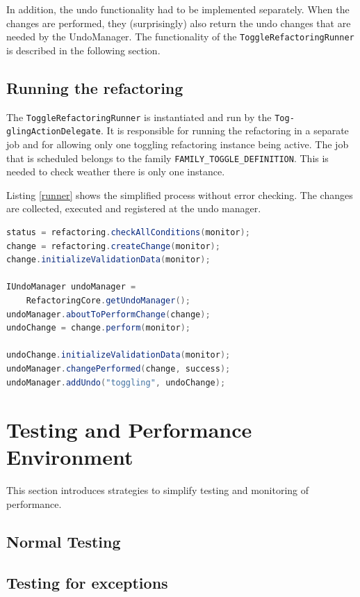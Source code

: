 In addition, the undo functionality had to be implemented separately. When the 
changes are performed, they (surprisingly) also return the undo changes that are 
needed by the UndoManager. The functionality of the 
\texttt{ToggleRefactoringRunner} is described in the following section.

\subsection{Running the refactoring}\label{runnersec}
The \texttt{ToggleRefactoringRunner} is instantiated and run by the 
\texttt{Tog- glingActionDelegate}. It is responsible for running the refactoring 
in a separate job and for allowing only one toggling refactoring instance being
active. The job that is scheduled belongs to the family
\texttt{FAMILY\_TOGGLE\_DEFINITION}. This is needed to check weather there is
only one instance.

Listing \ref{runner} shows the simplified process without error checking. The 
changes are collected, executed and registered at the undo manager.

\begin{lstlisting}[caption={running the refactoring},label={runner},language=java]
status = refactoring.checkAllConditions(monitor);
change = refactoring.createChange(monitor);
change.initializeValidationData(monitor);

IUndoManager undoManager = 
    RefactoringCore.getUndoManager();
undoManager.aboutToPerformChange(change);
undoChange = change.perform(monitor);

undoChange.initializeValidationData(monitor);
undoManager.changePerformed(change, success);
undoManager.addUndo("toggling", undoChange);
\end{lstlisting}

\section{Testing and Performance Environment}

This section introduces strategies to simplify testing and monitoring of 
performance.

\subsection{Normal Testing}


\subsection{Testing for exceptions}

